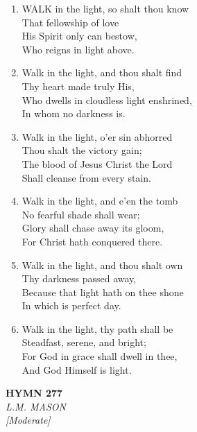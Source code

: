 \begin{enumerate}
    \item WALK in the light, so shalt thou know \\
        That fellowship of love \\
        His Spirit only can bestow, \\
        Who reigns in light above.

    \item Walk in the light, and thou shalt find \\
        Thy heart made truly His, \\
        Who dwells in cloudless light enshrined, \\
        In whom no darkness is.

    \item Walk in the light, o'er sin abhorred \\
        Thou shalt the victory gain; \\
        The blood of Jesus Christ the Lord \\
        Shall cleanse from every stain.

    \item Walk in the light, and e'en the tomb \\
        No fearful shade shall wear; \\
        Glory shall chase away its gloom, \\
        For Christ hath conquered there.

    \item Walk in the light, and thou shalt own \\
        Thy darkness passed away, \\
        Because that light hath on thee shone \\
        In which is perfect day.

    \item Walk in the light, thy path shall be \\
        Steadfast, serene, and bright; \\
        For God in grace shall dwell in thee, \\
        And God Himself is light.

\end{enumerate}

\newpage
\begin{center}
    {\Large \textbf{HYMN 277}}
    \\
    \textit{L.M. MASON}
    \\
    \textit{\small [Moderate]}
\end{center}
\vspace{1em}

